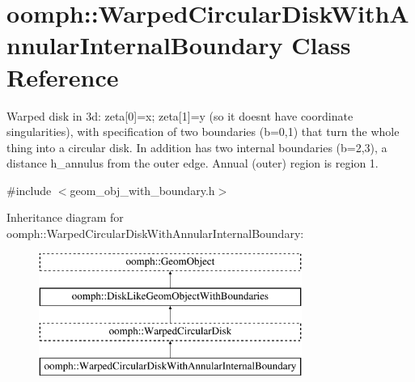 \hypertarget{classoomph_1_1WarpedCircularDiskWithAnnularInternalBoundary}{}\section{oomph\+:\+:Warped\+Circular\+Disk\+With\+Annular\+Internal\+Boundary Class Reference}
\label{classoomph_1_1WarpedCircularDiskWithAnnularInternalBoundary}


Warped disk in 3d\+: zeta\mbox{[}0\mbox{]}=x; zeta\mbox{[}1\mbox{]}=y (so it doesn\textquotesingle{}t have coordinate singularities), with specification of two boundaries (b=0,1) that turn the whole thing into a circular disk. In addition has two internal boundaries (b=2,3), a distance h\+\_\+annulus from the outer edge. Annual (outer) region is region 1.  




{\ttfamily \#include $<$geom\+\_\+obj\+\_\+with\+\_\+boundary.\+h$>$}

Inheritance diagram for oomph\+:\+:Warped\+Circular\+Disk\+With\+Annular\+Internal\+Boundary\+:\begin{figure}[H]
\begin{center}
\leavevmode
\includegraphics[height=4.000000cm]{classoomph_1_1WarpedCircularDiskWithAnnularInternalBoundary}
\end{center}
\end{figure}
